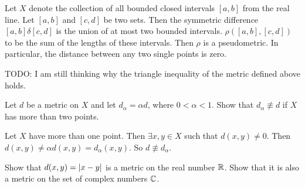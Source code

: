 \begin{summary}
	Let $ X $ denote the collection of all bounded closed intervals $ [a,b] $ from the real line. Let $ [a,b] $ and $ [c,d] $ be two sets. Then the symmetric difference $ [a,b] \delta [c,d] $ is the union of at most two bounded intervals. $ \rho([a,b],[c,d]) $ to be the sum of the lengths of these intervals. Then $ \rho $ is a pseudometric. In particular, the distance between any two single points is zero.
\end{summary}
\begin{remark}
	{\color{red} \noindent TODO:} I am still thinking why the triangle inequality of the metric defined above holds.
\end{remark}

\begin{problem}
	Let $ d $ be a metric on $ X $ and let $ d_\alpha = \alpha d $, where $ 0 < \alpha < 1 $. Show that $ d_\alpha \not\equiv d $ if $ X $ has more than two points.
\end{problem}
\begin{solution}
	Let $ X $ have more than one point. Then $ \exists x,y \in X $ such that $ d(x,y) \neq 0 $. Then $ d(x,y) \neq \alpha d(x,y) = d_\alpha(x,y) $. So $ d \not\equiv d_\alpha $.
\end{solution}


\begin{problem}
	Show that $ d(x,y) = |x-y| $ is a metric on the real number $ \mathbb{R} $. Show that it is also a metric on the set of complex numbers $ \mathbb{C} $.
\end{problem}

